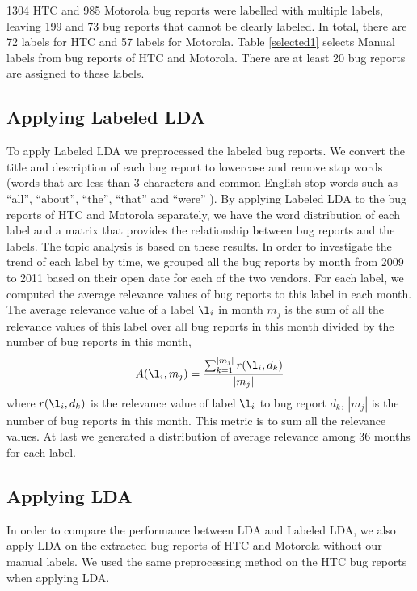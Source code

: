 \documentclass[10pt, conference, compsocconf]{IEEEtran}
\begin{document}
1304 HTC and 985 Motorola bug reports were labelled with multiple
labels, leaving 199 and 73 bug reports that cannot be clearly labeled.
In total, there are 72 labels for HTC and 57 labels for Motorola.
Table \ref{selected1} selects Manual labels from bug reports of HTC
and Motorola.  
There are at least 20 bug reports are assigned to these
labels.

\subsection{Applying Labeled LDA}
To apply Labeled LDA we preprocessed the labeled bug reports. We convert the title and description of each bug report to lowercase and remove stop words (words that are less than 3 characters and common English stop words such as ``all'', ``about'', ``the'', ``that'' and ``were'' ).
By applying Labeled LDA to the bug reports of HTC and Motorola separately, we have the word distribution of each label and a matrix that provides the relationship between bug reports and the labels. The topic analysis is based on these results. In order to investigate the trend of each label by time, we grouped all the bug reports by month from 2009 to 2011 based on their open date for each of the two vendors. For each label, we computed the average relevance values of bug reports to this label in each month. The average relevance value of a label \begin{math} \l_i \end{math} in month \begin{math} m_j \end{math} is the sum of all the relevance values of this label over all bug reports in this month divided by the number of bug reports in this month,
\begin{equation}
A(\l_i,m_j) = \frac{\sum_{\substack{k=1}}^{|m_j|}r(\l_i,d_k)}{|m_j|}
\end{equation}
where $r(\l_i,d_k)$ is the relevance value of label $\l_i$ to bug report $d_k$, $|m_j|$ is the number of bug reports in this month. This metric is to sum all the relevance values. At last we generated a distribution of average relevance among 36 months for each label.

\subsection{Applying LDA}
In order to compare the performance between LDA and Labeled LDA, we also apply LDA on the extracted bug reports of HTC and Motorola without our manual labels. We used the same preprocessing method on the HTC bug reports when applying LDA. 
\end{document}
